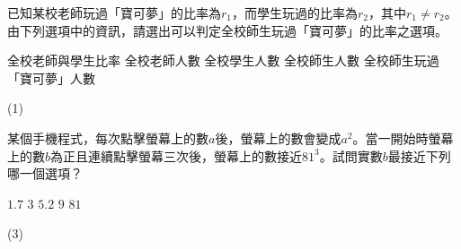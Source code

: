 \begin{QUESTION}
    \begin{QBODY}
        已知某校老師玩過「寶可夢」的比率為${{r}_{1}}$，而學生玩過的比率為${{r}_{2}}$，其中${{r}_{1}}\ne {{r}_{2}}$。
        由下列選項中的資訊，請選出可以判定全校師生玩過「寶可夢」的比率之選項。
        \begin{QOPS}
            \QOP 全校老師與學生比率     
            \QOP 全校老師人數
            \QOP 全校學生人數
            \QOP 全校師生人數
            \QOP 全校師生玩過「寶可夢」人數
        \end{QOPS}
    \end{QBODY}
    \begin{QFROMS}
    \end{QFROMS}
    \begin{QTAGS}
    \end{QTAGS}
    \begin{QANS}
        (1)
    \end{QANS}
    \begin{QSOL}
    \end{QSOL}
    \begin{QEMPTYSPACE}
    \end{QEMPTYSPACE}
\end{QUESTION}
\begin{QUESTION}
    \begin{QBODY}
        某個手機程式，每次點擊螢幕上的數$a$後，螢幕上的數會變成${{a}^{2}}$。當一開始時螢幕上的數$b$為正且連續點擊螢幕三次後，螢幕上的數接近${{81}^{3}}$。試問實數$b$最接近下列哪一個選項？
        \begin{QOPS}
            \QOP $1.7$      
            \QOP $3$      
            \QOP $5.2$      
            \QOP $9$      
            \QOP $81$
        \end{QOPS}
    \end{QBODY}
    \begin{QFROMS}
    \end{QFROMS}
    \begin{QTAGS}
    \end{QTAGS}
    \begin{QANS}
        (3)
    \end{QANS}
    \begin{QSOL}
    \end{QSOL}
    \begin{QEMPTYSPACE}
    \end{QEMPTYSPACE}
\end{QUESTION}
